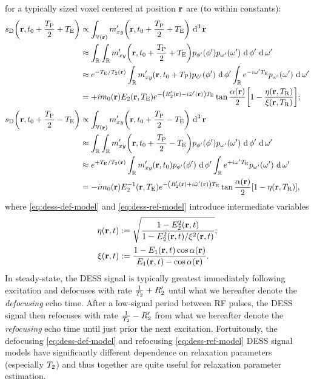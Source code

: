 for a typically sized voxel centered at position $\mathbf{r}$ are
(to within constants):
\begin{align}
	\dess\paren{\bmr,t_0+\frac{\TP}{2}+\TE} 
		&\propto \int_{\setv\paren{\bmr}} 
			\mxyp\paren{\bmr,t_0+\frac{\TP}{2}+\TE} \dercubed{\bmr}
			\label{eq:dess-def-int} \\
		&\approx \int_\real \int_\real \mxyp\paren{\bmr,t_0+\frac{\TP}{2}+\TE} 
			\dist{\php}\paren{\php} \dist{\omp}\paren{\omp} \der{\php} \der{\omp}
			\nonumber \\
		&\approx e^{-\TE/\Tt\pr}
			\int_\real \mxyp\paren{\bmr,t_0+\TP} \dist{\php}\paren{\php} \der{\php} 
			\int_\real e^{-i\omp\TE} \dist{\omp}\paren{\omp} \der{\omp}
			\nonumber \\
		&= +i\mzero\pr \Et\paren{\bmr,\TE} e^{-\paren{\Rtp\pr-i\ompmed\pr}\TE}
			\tan\frac{\alpha\pr}{2} 
			\brac{1 - \frac{\eta\paren{\bmr,\TR}}{\xi\paren{\bmr,\TR}}};
			\label{eq:dess-def-model} \\
	\dess\paren{\bmr,t_0+\frac{\TP}{2}-\TE}
		&\propto \int_{\setv\paren{\bmr}}
			\mxyp\paren{\bmr,t_0+\frac{\TP}{2}-\TE} \dercubed{\bmr}
			\label{eq:dess-ref-int} \\
		&\approx \int_\real \int_\real \mxyp\paren{\bmr,t_0+\frac{\TP}{2}-\TE} 
			\dist{\php}\paren{\php} \dist{\omp}\paren{\omp} \der{\php} \der{\omp}
			\nonumber \\
		&\approx e^{+\TE/\Tt\pr}
			\int_\real \mxyp\paren{\bmr,t_0} \dist{\php}\paren{\php} \der{\php} 
			\int_\real e^{+i\omp\TE} \dist{\omp}\paren{\omp} \der{\omp} 
			\nonumber \\
		&= -i\mzero\pr \Et^{-1}\paren{\bmr,\TE} e^{-\paren{\Rtp\pr+i\ompmed\pr}\TE}
			\tan\frac{\alpha\pr}{2}
			\brac{1 - \eta\paren{\bmr,\TR}},
			\label{eq:dess-ref-model}
\end{align}	
where \eqref{eq:dess-def-model} and \eqref{eq:dess-ref-model}
introduce intermediate variables
\begin{align}
	\eta\prt &:=
		\sqrt{\frac{1-\Et^2\prt}{1-\Et^2\prt/\xi^2\prt}};
		\nonumber \\
	\xi\prt &:=
		\frac{1-\Eo\prt \cos{\flip\pr}}{\Eo\prt - \cos{\flip\pr}}.
		\nonumber
\end{align}
In steady-state, 
the DESS signal is typically greatest 
immediately following excitation 
and defocuses with rate $\frac{1}{T_2}+R_2'$
until what we hereafter denote
the \emph{defocusing} echo time.
After a low-signal period between RF pulses,
the DESS signal then refocuses
with rate $\frac{1}{T_2}-R_2'$
from what we hereafter denote
the \emph{refocusing} echo time
until just prior the next excitation.
Fortuitously,
the defocusing \eqref{eq:dess-def-model}
and refocusing \eqref{eq:dess-ref-model}
DESS signal models
have significantly different dependence 
on relaxation parameters (especially $T_2$)
and thus together are quite useful
for relaxation parameter estimation.

